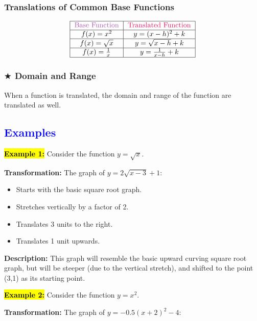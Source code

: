 \documentclass[12pt,a4paper]{article}
\begin{document}
\subsubsection*{Translations of Common Base Functions}
\vspace*{\fill}
\[
\begin{tabular}{|c|c|}
    \hline
    \textcolor{Orchid}{Base Function} & \textcolor{WildStrawberry}{Translated Function} \\
    \hline
    \( f(x) = x^2 \) & \( y = (x - h)^2 + k \) \\
    \hline
    \( f(x) = \sqrt{x} \) & \( y = \sqrt{x - h} + k \) \\
    \hline    
    \( f(x) = \frac{1}{x} \) & \( y = \frac{1}{x - h} + k \) \\
    \hline
\end{tabular}
\]
\vspace*{\fill}

\subsubsection*{$\bigstar$ Domain and Range}
When a function is translated, the domain and range of the function are translated as well.

\subsection*{\textcolor{blue}{Examples}}

\textbf{\hl{Example 1:}} Consider the function \(y = \sqrt{x}\).

\textbf{Transformation:} The graph of \(y = 2\sqrt{x-3} + 1\):

\begin{itemize}
    \item Starts with the basic square root graph.
    \item Stretches vertically by a factor of 2.
    \item Translates 3 units to the right.
    \item Translates 1 unit upwards.
\end{itemize}

\textbf{Description:} This graph will resemble the basic upward curving square root graph, but will be steeper (due to the vertical stretch), and shifted to the point (3,1) as its starting point.

\textbf{\hl{Example 2:}} Consider the function \(y = x^2\).

\textbf{Transformation:} The graph of \(y = -0.5(x+2)^2 - 4\):
\end{document}

